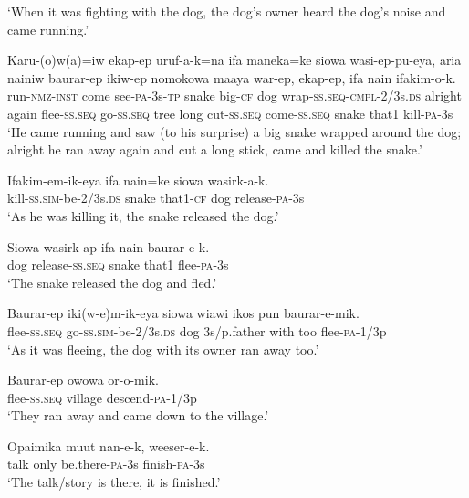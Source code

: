 \glt ‘When it was fighting with the dog, the dog’s owner heard the dog’s noise and came running.’ \\
\z


\ea
\gll  Karu-(o)w(a)=iw  ekap-ep  uruf-a-k=na  ifa  maneka=ke  siowa  wasi-ep-pu-eya,  aria  nainiw  baurar-ep  ikiw-ep  nomokowa            maaya  war-ep,  ekap-ep,  ifa  nain  ifakim-o-k. \\
run-\textsc{nmz}-\textsc{inst}  come  see-\textsc{pa}-3s-\textsc{tp}  snake  big-\textsc{cf}  dog                wrap-\textsc{ss.seq}-\textsc{cmpl}-2/3s.\textsc{ds}  alright  again  flee-\textsc{ss.seq}  go-\textsc{ss.seq}  tree long  cut-\textsc{ss.seq}  come-\textsc{ss.seq}  snake  that1  kill-\textsc{pa}-3s \\




\glt ‘He came running and saw (to his surprise) a big snake wrapped around the dog; alright he ran away again and cut a long stick, came and killed the snake.’ \\
\z


\ea
\gll  Ifakim-em-ik-eya  ifa  nain=ke  siowa  wasirk-a-k. \\
kill-\textsc{ss}.\textsc{sim}-be-2/3s.\textsc{ds}  snake  that1-\textsc{cf}  dog  release-\textsc{pa}-3s \\
\glt ‘As he was killing it, the snake released the dog.’ \\
\z


\ea
\gll  Siowa  wasirk-ap  ifa  nain  baurar-e-k. \\
dog  release-\textsc{ss.seq}  snake  that1  flee-\textsc{pa}-3s \\
\glt ‘The snake released the dog and fled.’ \\
\z


\ea
\gll  Baurar-ep  iki(w-e)m-ik-eya  siowa  wiawi  ikos  pun  baurar-e-mik. \\
flee-\textsc{ss.seq}  go-\textsc{ss}.\textsc{sim}-be-2/3s.\textsc{ds}  dog  3s/p.father  with  too  flee-\textsc{pa}-1/3p \\
\glt ‘As it was fleeing, the dog with its owner ran away too.’ \\
\z


\ea
\gll  Baurar-ep  owowa  or-o-mik. \\
flee-\textsc{ss.seq}  village  descend-\textsc{pa}-1/3p \\
\glt ‘They ran away and came down to the village.’ \\
\z


\ea
\gll  Opaimika  muut  nan-e-k,  weeser-e-k. \\
talk  only  be.there-\textsc{pa}-3s  finish-\textsc{pa}-3s \\
\glt ‘The talk/story is there, it is finished.’ \\
\z

